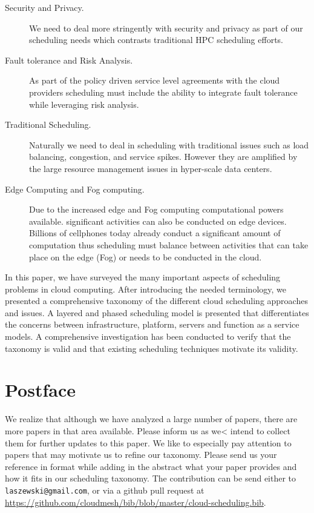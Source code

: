 \documentclass[final,5p,times,twocolumn]{elsarticle}
\begin{document}
\begin{description}
\item[Security and Privacy.]  We need to deal more stringently with
security and privacy as part of our scheduling needs which contrasts
traditional HPC scheduling efforts.

\item[Fault tolerance and Risk Analysis.] As part of the policy driven
service level agreements with the cloud providers scheduling must
include the ability to integrate fault tolerance while leveraging risk
analysis.

\item[Traditional Scheduling.] Naturally we need to deal in scheduling
with traditional issues such as load balancing, congestion, and
service spikes. However they are amplified by the large resource
management issues in hyper-scale data centers.

\item[Edge Computing and Fog computing.] Due to the increased edge and
Fog computing computational powers available. significant activities
can also be conducted on edge devices. Billions of cellphones today
already conduct a significant amount of computation thus scheduling
must balance between activities that can take place on the edge (Fog)
or needs to be conducted in the cloud.

\end{description}


In this paper, we have surveyed the many important aspects of
scheduling problems in cloud computing. After introducing the needed
terminology, we presented a comprehensive taxonomy of the different
cloud scheduling approaches and issues. A layered and phased
scheduling model is presented that differentiates the concerns between
infrastructure, platform, servers and function as a service models. A
comprehensive investigation has been conducted to verify that the
taxonomy is valid and that existing scheduling techniques motivate its
validity.










\appendix

\section{Postface}

We realize that although we have analyzed a large number of papers,
there are more papers in that area available. Please inform us as we<
intend to collect them for further updates to this paper. We like to
especially pay attention to papers that may motivate us to refine our
taxonomy. Please send us your reference in \BibTeX format while adding
in the abstract what your paper provides and how it fits in our
scheduling taxonomy. The contribution can be send either to
\verb|laszewski@gmail.com|, or via a github pull request at
\url{https://github.com/cloudmesh/bib/blob/master/cloud-scheduling.bib}.



%
%




\end{document}
